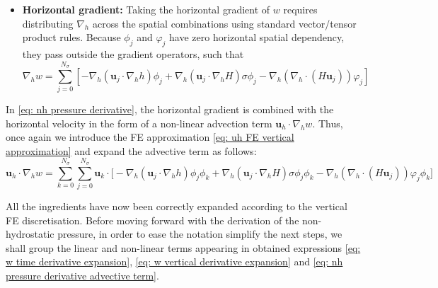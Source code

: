 \documentclass{article}
\newcommand{\Ns}{N_\sigma}
\newcommand{\uh}{\mathbf{u}_h}
\newcommand{\uj}{\mathbf{u}_j}
\newcommand{\uk}{\mathbf{u}_k}
\newcommand{\sumj}{\sum_{j=0}^{\Ns}}
\newcommand{\sumk}{\sum_{k=0}^{\Ns}}
\newcommand{\nablah}{\nabla_h}
\newcommand{\vphij}{\varphi_j}
\begin{document}
\begin{itemize}
    \item \textbf{Horizontal gradient:}
    Taking the horizontal gradient of $w$ requires distributing $\nablah$ across the spatial combinations using standard vector/tensor product rules. Because $\phi_j$ and $\vphij$ have zero horizontal spatial dependency, they pass outside the gradient operators, such that
    $$\nablah w = \sumj \left[ -\nablah(\uj \cdot \nablah h)\phi_j + \nablah(\uj \cdot \nablah H)\sigma \phi_j - \nablah\left(\nablah \cdot (H \uj)\right)\vphij \right]$$
    
\end{itemize}

In \eqref{eq: nh pressure derivative}, the horizontal gradient is combined with the horizontal velocity in the form of a non-linear advection term $\uh \cdot \nablah w$. 
Thus, once again we introduce the FE approximation \eqref{eq: uh FE vertical approximation} and expand the advective term as follows:
\begin{equation}
    \uh \cdot \nablah w = \sumk\sumj \uk \cdot \Big[ -\nablah(\uj \cdot \nablah h)\phi_j\phi_k + \nablah(\uj \cdot \nablah H)\sigma \phi_j\phi_k - \nablah\left(\nablah \cdot (H \uj)\right)\vphij\phi_k \Big]
    \label{eq: nh pressure derivative advective term}
\end{equation}

All the ingredients have now been correctly expanded according to the vertical FE discretisation. 
Before moving forward with the derivation of the non-hydrostatic pressure, in order to ease the notation simplify the next steps, we shall group the linear and non-linear terms appearing in obtained expressions \eqref{eq: w time derivative expansion}, \eqref{eq: w vertical derivative expansion} and \eqref{eq: nh pressure derivative advective term}. 
\end{document}

